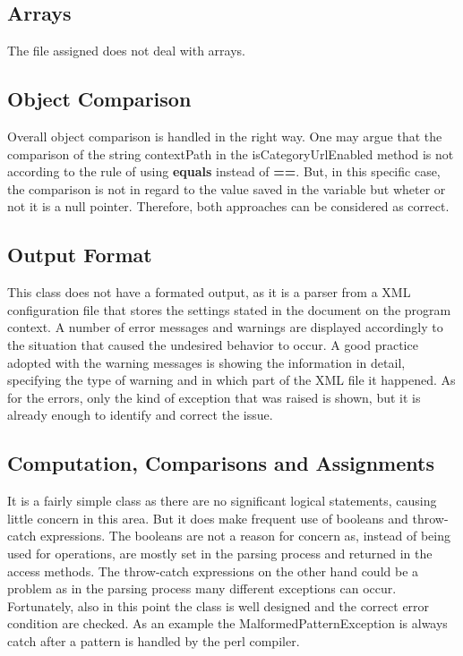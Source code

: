 \documentclass[a4paper]{article}
\begin{document}
\subsection{Arrays}
The file assigned does not deal with arrays.
\subsection{Object Comparison}
Overall object comparison is handled in the right way. One may argue that the comparison of the string contextPath in the isCategoryUrlEnabled method is not according to the rule of using \textbf{equals} instead of \textbf{==}. But, in this specific case, the comparison is not in regard to the value saved in the variable but wheter or not it is a null pointer. Therefore, both approaches can be considered as correct.

\subsection{Output Format}
This class does not have a formated output, as it is a parser from a XML configuration file that stores the settings stated in the document on the program context.  \newline
A number of error messages and warnings are displayed accordingly to the situation that caused the undesired behavior to occur.  A good practice adopted with the warning messages is showing the information in detail,  specifying the type of warning and in which part of the XML file it happened. As for the errors, only the kind of exception that was raised is shown, but it is already enough to identify and correct the issue.

\subsection{Computation, Comparisons and Assignments}
It is a fairly simple class as there are no significant logical statements, causing little concern in this area. But it does make frequent use of booleans and throw-catch expressions. \newline
The booleans are not a reason for concern as, instead of being used for operations, are mostly set in the parsing process and returned in the access methods. \newline
The throw-catch expressions on the other hand could be a problem as in the parsing process many different exceptions can occur. Fortunately, also in this point the class is well designed and the correct error condition are checked. As an example the MalformedPatternException is always catch after a pattern is handled by the perl compiler. 
\end{document}
